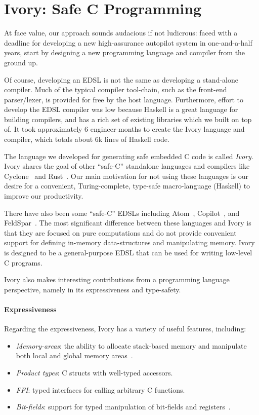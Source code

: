 \section{Ivory: Safe C Programming}
\label{sec:ivory}

At face value, our approach sounds audacious if not ludicrous: faced with a
deadline for developing a new high-assurance autopilot system in one-and-a-half
years, start by designing a new programming language and compiler from the
ground up.

Of course, developing an EDSL is not the same as developing a stand-alone
compiler.  Much of the typical compiler tool-chain, such as the front-end
parser/lexer, is provided for free by the host language.  Furthermore, effort
to develop the EDSL compiler was low because Haskell is a great language for
building compilers, and has a rich set of existing libraries
which we built on top of. It took approximately 6 engineer-months to create the
Ivory language and compiler, which totals about 6k lines of Haskell code.

The language we developed for generating safe embedded C code is called
\emph{Ivory}.  Ivory shares the goal of other ``safe-C'' standalone languages
and compilers like Cyclone~\cite{cyclone} and Rust~\cite{rust}.  Our main
motivation for not using these languages is our desire for a convenient,
Turing-complete, type-safe macro-language (Haskell) to improve our productivity.

There have also been some ``safe-C'' EDSLs including Atom~\cite{atom},
Copilot~\cite{copilot}, and FeldSpar~\cite{feldspar1}.  The most significant
difference between these languages and Ivory is that they are focused on pure
computations and do not provide convenient support for defining in-memory
data-structures and manipulating memory.  Ivory is designed to be a
general-purpose EDSL that can be used for writing low-level C programs.

Ivory also makes interesting contributions from a programming language
perspective, namely in its expressiveness and type-safety.

\paragraph{Expressiveness}
Regarding the expressiveness, Ivory has a variety of useful features, including:
\begin{itemize}
  \item \emph{Memory-areas}: the ability to allocate stack-based memory and
    manipulate both local and global memory areas~\cite{memareas}.
  \item \emph{Product types}: C structs with well-typed accessors.
  \item \emph{FFI}: typed interfaces for calling arbitrary C functions.
  \item \emph{Bit-fields}: support for typed manipulation of bit-fields and
    registers~\cite{high-level}.
\end{itemize}


